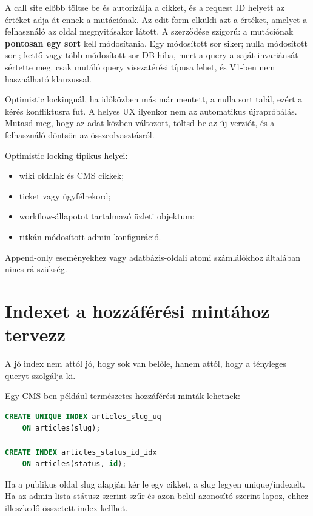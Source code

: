 A call site előbb töltse be és autorizálja a cikket, és a request ID helyett az  értéket adja át ennek a mutációnak. Az edit form elküldi azt a  értéket, amelyet a felhasználó az oldal megnyitásakor látott. A  szerződése szigorú: a mutációnak \textbf{pontosan egy sort} kell módosítania. Egy módosított sor siker; nulla módosított sor ; kettő vagy több módosított sor DB-hiba, mert a query a saját invariánsát sértette meg.  csak mutáló query visszatérési típusa lehet, és V1-ben nem használható  klauzussal.

Optimistic lockingnál, ha időközben más már mentett, a  nulla sort talál, ezért a kérés konfliktusra fut. A helyes UX ilyenkor nem az automatikus újrapróbálás. Mutasd meg, hogy az adat közben változott, töltsd be az új verziót, és a felhasználó döntsön az összeolvasztásról.

Optimistic locking tipikus helyei:

\begin{itemize}
\item wiki oldalak és CMS cikkek;
\item ticket vagy ügyfélrekord;
\item workflow-állapotot tartalmazó üzleti objektum;
\item ritkán módosított admin konfiguráció.
\end{itemize}

Append-only eseményekhez vagy adatbázis-oldali atomi számlálókhoz általában nincs rá szükség.

\section{Indexet a hozzáférési mintához tervezz}

A jó index nem attól jó, hogy sok van belőle, hanem attól, hogy a tényleges queryt szolgálja ki.

Egy CMS-ben például természetes hozzáférési minták lehetnek:

\begin{lstlisting}[language=SQL]
CREATE UNIQUE INDEX articles_slug_uq
    ON articles(slug);

CREATE INDEX articles_status_id_idx
    ON articles(status, id);
\end{lstlisting}

Ha a publikus oldal slug alapján kér le egy cikket, a slug legyen unique/indexelt. Ha az admin lista státusz szerint szűr és azon belül azonosító szerint lapoz, ehhez illeszkedő összetett index kellhet.

